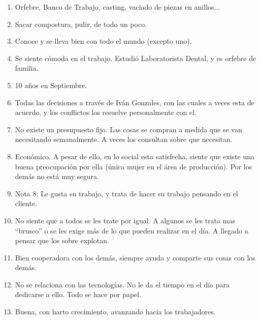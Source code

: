 \begin{enumerate}
	\item Orfebre, Banco de Trabajo, casting, vaciado de piezas en anillos...
	\item Sacar compostura, pulir, de todo un poco.
	\item Conoce y se lleva bien con todo el mundo (excepto uno).
	\item Se siente cómoda en el trabajo. Estudió Laboratorista Dental, y es orfebre de familia.
	\item 10 años en Septiembre.
	\item Todas las decisiones a través de Iván Gonzales, con las cuales a veces esta de acuerdo, y los conflictos los resuelve personalmente con el.
	\item No existe un presupuesto fijo. Las cosas se compran a medida que se van necesitando semanalmente. A veces los consultan sobre que necesitan.
	\item Económico. A pesar de ello, en lo social esta satisfecha, siente que existe una buena preocupación por ella (única mujer en el área de producción). Por los demás no está muy segura.
	\item Nota 8: Le gusta su trabajo, y trata de hacer su trabajo pensando en el cliente.
	\item No siente que a todos se les trate por igual. A algunos se les trata mas ``brusco'' o se les exige más de lo que pueden realizar en el día. A llegado a pensar que los sobre explotan.
	\item Bien cooperadora con los demás, siempre ayuda y comparte sus cosas con los demás.
	\item No se relaciona con las tecnologías. No le da el tiempo en el día para dedicarse a ello. Todo se hace por papel.
	\item Buena, con harto crecimiento, avanzando hacia los trabajadores.
\end{enumerate}


